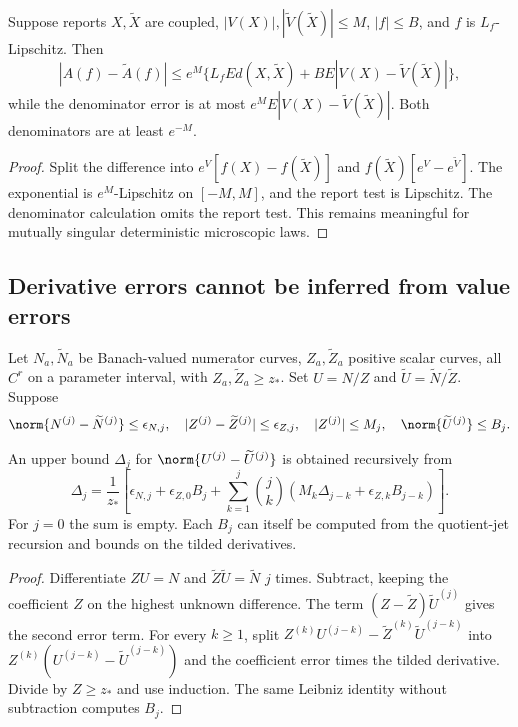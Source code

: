 \begin{proposition}\label{prop:coupling}
Suppose reports $X,\widetilde X$ are coupled, $|V(X)|,|\widetilde V(\widetilde X)|\le M$, $|f|\le B$, and $f$ is $L_f$-Lipschitz. Then
\[
 |A(f)-\widetilde A(f)|
 \le e^M\{L_fE d(X,\widetilde X)+B E|V(X)-\widetilde V(\widetilde X)|\},
\]
while the denominator error is at most $e^M E|V(X)-\widetilde V(\widetilde X)|$. Both denominators are at least $e^{-M}$.
\end{proposition}
\begin{proof}
Split the difference into $e^V[f(X)-f(\widetilde X)]$ and
$f(\widetilde X)[e^V-e^{\widetilde V}]$. The exponential is $e^M$-Lipschitz on $[-M,M]$, and the report test is Lipschitz. The denominator calculation omits the report test. This remains meaningful for mutually singular deterministic microscopic laws.
\end{proof}

\subsection{Derivative errors cannot be inferred from value errors}
Let $N_a,\widetilde N_a$ be Banach-valued numerator curves, $Z_a,\widetilde Z_a$ positive scalar curves, all $C^r$ on a parameter interval, with $Z_a,\widetilde Z_a\ge z_*$. Set $U=N/Z$ and $\widetilde U=\widetilde N/\widetilde Z$. Suppose
\[
 \norm{N^{(j)}-\widetilde N^{(j)}}\le\epsilon_{N,j},\quad
 |Z^{(j)}-\widetilde Z^{(j)}|\le\epsilon_{Z,j},\quad
 |Z^{(j)}|\le M_j,\quad\norm{\widetilde U^{(j)}}\le B_j.
\]

\begin{theorem}\label{thm:jet-error}
An upper bound $\Delta_j$ for $\norm{U^{(j)}-\widetilde U^{(j)}}$ is obtained recursively from
\begin{equation}
 \Delta_j=\frac1{z_*}\left[
 \epsilon_{N,j}+\epsilon_{Z,0}B_j+
 \sum_{k=1}^j\binom jk(M_k\Delta_{j-k}+\epsilon_{Z,k}B_{j-k})\right].
 \label{eq:response-error}
\end{equation}
For $j=0$ the sum is empty. Each $B_j$ can itself be computed from the quotient-jet recursion and bounds on the tilded derivatives.
\end{theorem}
\begin{proof}
Differentiate $ZU=N$ and $\widetilde Z\widetilde U=\widetilde N$ $j$ times. Subtract, keeping the coefficient $Z$ on the highest unknown difference. The term $(Z-\widetilde Z)\widetilde U^{(j)}$ gives the second error term. For every $k\ge1$, split
$Z^{(k)}U^{(j-k)}-\widetilde Z^{(k)}\widetilde U^{(j-k)}$
into $Z^{(k)}(U^{(j-k)}-\widetilde U^{(j-k)})$ and the coefficient error times the tilded derivative. Divide by $Z\ge z_*$ and use induction. The same Leibniz identity without subtraction computes $B_j$.
\end{proof}

